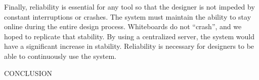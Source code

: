 Finally, reliability is essential for any tool so that the designer is not impeded by constant interruptions or crashes. 
The system must maintain the ability to stay online during the entire design process. Whiteboards do not ``crash'', and we hoped to replicate that stability. 
By using a centralized server, the system would have a significant increase in stability. Reliability is necessary for designers to be able to continuously use the system.


CONCLUSION









